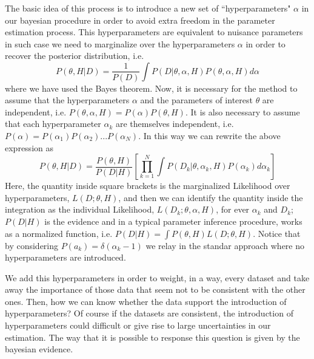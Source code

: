 \documentclass[onecolumn,           %
               showpacs,            %
               preprintnumbers,     %
               aps,                 %
               prl,          	    %
               letterpaper,             %
               superscriptaddress,      %
               nofootinbib,         %
               tightenlines,        %
               floats,floatfix      %
               ,usenatbib,
               ]{revtex4-1}
\begin{document}
The basic idea of this process is to introduce a new set of ``hyperparameters" $\alpha$ in our bayesian procedure in order to avoid extra freedom in the parameter estimation process.  This hyperparameters are equivalent to nuisance parameters in such case we need to marginalize over the hyperparameters $\alpha$ in order to recover the posterior distribution, i.e.
\begin{equation}
P(\theta,H|D)=\frac{1}{P(D)}\int P(D|\theta,\alpha,H)P(\theta,\alpha,H)d\alpha
\end{equation}
where we have used the Bayes theorem. Now, it is necessary for the method to assume that the hyperparameters $\alpha$ and the parameters of interest $\theta$ are independent, i.e. $P(\theta,\alpha,H)=P(\alpha)P(\theta,H)$. It is also necessary to assume that each hyperparameter $\alpha_k$ are themselves independent, i.e. $P(\alpha)=P(\alpha_1)P(\alpha_2)...P(\alpha_N)$. In this way we can rewrite the above expression as
\begin{equation}
P(\theta,H|D)=\frac{P(\theta,H)}{P(D|H)}\left[\prod_{k=1}^N\int P(D_k|\theta,\alpha_k,H)P(\alpha_k)d\alpha_k\right]
\end{equation}
Here, the quantity inside square brackets is the marginalized Likelihood over hyperparameters, $L(D;\theta,H)$, and then we can identify the quantity inside the integration as the individual Likelihood, $L(D_k;\theta,\alpha,H)$, for ever $\alpha_k$ and $D_k$; $P(D|H)$ is the evidence and in a typical parameter inference procedure, works as a normalized function, i.e. $P(D|H)=\int P(\theta,H)L(D;\theta,H)$. Notice that by considering $P(a_k)=\delta(\alpha_k-1)$ we relay in the standar approach where no hyperparameters are introduced.  

We add this hyperparameters in order to weight, in a way, every dataset and take away the importance of those data that seem not to be consistent with the other ones. Then, how we can know whether the data support the introduction of hyperparameters? Of course if the datasets are consistent, the introduction of hyperparameters could difficult or give rise to large uncertainties in our estimation. The way that it is possible to response this question is given by the bayesian evidence.
\end{document}

